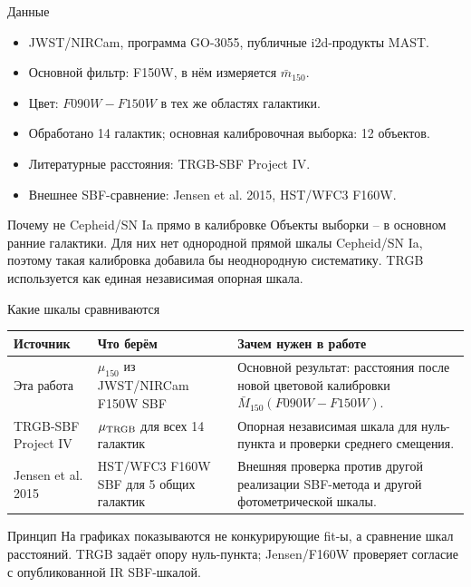 \documentclass[aspectratio=169, 11pt]{beamer}
\begin{document}
\begin{frame}{Данные}
    \begin{itemize}
        \item JWST/NIRCam, программа GO-3055, публичные i2d-продукты MAST.
        \item Основной фильтр: F150W, в нём измеряется $\bar{m}_{150}$.
        \item Цвет: $F090W-F150W$ в тех же областях галактики.
        \item Обработано 14 галактик; основная калибровочная выборка: 12 объектов.
        \item Литературные расстояния: TRGB-SBF Project IV.
        \item Внешнее SBF-сравнение: Jensen et al. 2015, HST/WFC3 F160W.
    \end{itemize}
    \vspace{0.15cm}
    \begin{block}{Почему не Cepheid/SN Ia прямо в калибровке}
        Объекты выборки -- в основном ранние галактики. Для них нет однородной прямой шкалы Cepheid/SN Ia, поэтому такая калибровка добавила бы неоднородную систематику. TRGB используется как единая независимая опорная шкала.
    \end{block}
\end{frame}

\begin{frame}{Какие шкалы сравниваются}
    \scriptsize
    \setlength{\tabcolsep}{3pt}
    \begin{tabular}{>{\raggedright\arraybackslash}p{}
                    >{\raggedright\arraybackslash}p{}
                    >{\raggedright\arraybackslash}p{}}
    \toprule
    Источник & Что берём & Зачем нужен в работе \\
    \midrule
    Эта работа & $\mu_{150}$ из JWST/NIRCam F150W SBF & Основной результат: расстояния после новой цветовой калибровки $\bar{M}_{150}(F090W-F150W)$. \\
    TRGB-SBF Project IV & $\mu_{\rm TRGB}$ для всех 14 галактик & Опорная независимая шкала для нуль-пункта и проверки среднего смещения. \\
    Jensen et al. 2015 & HST/WFC3 F160W SBF для 5 общих галактик & Внешняя проверка против другой реализации SBF-метода и другой фотометрической шкалы. \\
    \bottomrule
    \end{tabular}

    \vspace{0.25cm}
    \begin{block}{Принцип}
        На графиках показываются не конкурирующие fit-ы, а сравнение шкал расстояний.
        TRGB задаёт опору нуль-пункта; Jensen/F160W проверяет согласие с опубликованной IR SBF-шкалой.
    \end{block}
\end{frame}
\end{document}
